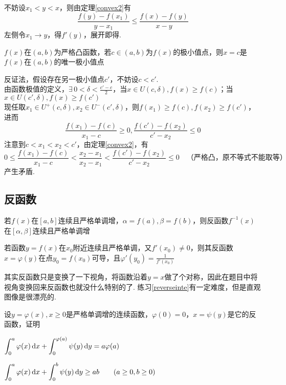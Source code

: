 \begin{analysis}
不妨设$x_1<y<x$，则由定理\ref{convex2}有
\[\frac{f(y)-f(x_1)}{y-x_1}\leq\frac{f(x)-f(y)}{x-y}\]
左侧令$x_1\to y$，得$f'(y)$，展开即得.
\end{analysis}
\begin{theorem}
$f(x)$在$(a,b)$为严格凸函数，若$c\in(a,b)$为$f(x)$的极小值点，则$x=c$是$f(x)$在$(a,b)$的唯一极小值点
\end{theorem}
\begin{analysis}
反证法，假设存在另一极小值点$c'$，不妨设$c<c'$.\\
由函数极值的定义，$\displaystyle\exists\,0<\delta<\frac{c'-c}{2}$，当$x\in U(c,\delta),f(x)\geq f(c)$；当$x\in U(c',\delta),f(x)\geq f(c')$\\
现任取$x_1\in U^+(c,\delta),x_2\in U^-(c',\delta)$，则$f(x_1)\geq f(c),f(x_2)\geq f(c')$，进而
\[\frac{f(x_1)-f(c)}{x_1-c}\geq 0,\frac{f(c')-f(x_2)}{c'-x_2}\leq 0\]
注意到$c<x_1<x_2<c'$，由定理\ref{convex2}，有
\[0\leq\frac{f(x_1)-f(c)}{x_1-c}<\frac{x_2-x_1}{x_2-x_1}<\frac{f(c')-f(x_2)}{c'-x_2}\leq 0\quad\text{（严格凸，原不等式不能取等）}\]
产生矛盾.
\end{analysis}

\subsection{反函数}
\begin{theorem}
	若$f(x)$在$[a,b]$连续且严格单调增，$\alpha=f(a),\beta=f(b)$，则反函数$f^{-1}(x)$在$[\alpha,\beta]$连续且严格单调增
\end{theorem}
\begin{theorem}
若函数$y=f(x)$在$x_0$附近连续且严格单调，又$f'(x_0)\ne 0$，则其反函数$x=\varphi(y)$在点$y_0=f(x_0)$可导，且$\displaystyle\varphi'(y_0)=\frac{1}{f'(x_0)}$
\end{theorem}
\par 其实反函数只是变换了一下视角，将函数沿着$y=x$做了个对称，因此在题目中将视角变换回来反函数也就没什么特别的了. 练习\ref{reverseinte}有一定难度，但是直观图像是很漂亮的.
\begin{exercise}
\label{reverseinte}
设$y=\varphi(x),x\geq 0$是严格单调增的连续函数，$\varphi(0)=0$，$x=\psi(y)$是它的反函数，证明
\begin{partlist}
	\item $\displaystyle\int_0^a\varphi(x)\,\mathrm{d} x+\int_0^{\varphi(a)}\psi(y)\,\mathrm{d} y=a\varphi(a)$
	\item $\displaystyle\int_0^a\varphi(x)\,\mathrm{d} x+\int_0^b\psi(y)\,\mathrm{d} y\geq ab\qquad(a\geq 0,b\geq 0)$
\end{partlist}
\end{exercise}


